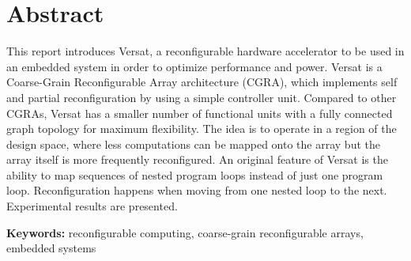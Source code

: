 
\section*{Abstract}


This report introduces Versat, a reconfigurable hardware accelerator
to be used in an embedded system in order to optimize performance and
power. Versat is a Coarse-Grain Reconfigurable Array architecture
(CGRA), which implements self and partial reconfiguration by using a
simple controller unit. Compared to other CGRAs, Versat has a smaller
number of functional units with a fully connected graph topology for
maximum flexibility. The idea is to operate in a region of the design
space, where less computations can be mapped onto the array but the
array itself is more frequently reconfigured. An original feature of
Versat is the ability to map sequences of nested program loops instead
of just one program loop. Reconfiguration happens when moving from one
nested loop to the next. Experimental results are presented.

\vfill

\textbf{\Large Keywords:} reconfigurable computing, coarse-grain reconfigurable arrays, embedded systems

